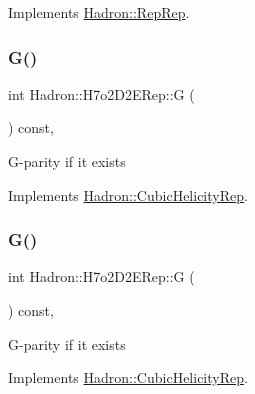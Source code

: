 Implements \mbox{\hyperlink{structHadron_1_1RepRep_a92c8802e5ed7afd7da43ccfd5b7cd92b}{Hadron\+::\+Rep\+Rep}}.

\mbox{\label{structHadron_1_1H7o2D2ERep_a6766559158a6095cb73ce82fcfd2de2e}} 
\subsubsection{\texorpdfstring{G()}{G()}\hspace{0.1cm}{\footnotesize\ttfamily [1/3]}}
{\footnotesize\ttfamily int Hadron\+::\+H7o2\+D2\+E\+Rep\+::G (\begin{DoxyParamCaption}{ }\end{DoxyParamCaption}) const\hspace{0.3cm}{\ttfamily [inline]}, {\ttfamily [virtual]}}

G-\/parity if it exists 

Implements \mbox{\hyperlink{structHadron_1_1CubicHelicityRep_a50689f42be1e6170aa8cf6ad0597018b}{Hadron\+::\+Cubic\+Helicity\+Rep}}.

\mbox{\label{structHadron_1_1H7o2D2ERep_a6766559158a6095cb73ce82fcfd2de2e}} 
\subsubsection{\texorpdfstring{G()}{G()}\hspace{0.1cm}{\footnotesize\ttfamily [2/3]}}
{\footnotesize\ttfamily int Hadron\+::\+H7o2\+D2\+E\+Rep\+::G (\begin{DoxyParamCaption}{ }\end{DoxyParamCaption}) const\hspace{0.3cm}{\ttfamily [inline]}, {\ttfamily [virtual]}}

G-\/parity if it exists 

Implements \mbox{\hyperlink{structHadron_1_1CubicHelicityRep_a50689f42be1e6170aa8cf6ad0597018b}{Hadron\+::\+Cubic\+Helicity\+Rep}}.

\mbox{\label{structHadron_1_1H7o2D2ERep_a6766559158a6095cb73ce82fcfd2de2e}} 
